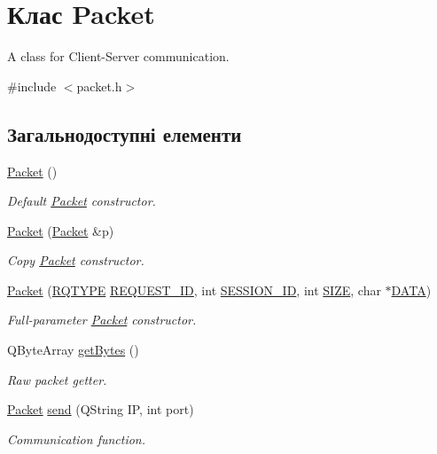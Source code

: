 \hypertarget{classPacket}{\section{Клас Packet}
\label{classPacket}
}


A class for Client-\/\-Server communication.  




{\ttfamily \#include $<$packet.\-h$>$}

\subsection*{Загальнодоступні елементи}
\begin{DoxyCompactItemize}
\item 
\hypertarget{classPacket_aabcfb963c0d5bc0fa554668f92989622}{\hyperlink{classPacket_aabcfb963c0d5bc0fa554668f92989622}{Packet} ()}\label{classPacket_aabcfb963c0d5bc0fa554668f92989622}

\begin{DoxyCompactList}\small\item\em Default \hyperlink{classPacket}{Packet} constructor. \end{DoxyCompactList}\item 
\hypertarget{classPacket_a30fc0d2e5589228708582af6b5b2a576}{\hyperlink{classPacket_a30fc0d2e5589228708582af6b5b2a576}{Packet} (\hyperlink{classPacket}{Packet} \&p)}\label{classPacket_a30fc0d2e5589228708582af6b5b2a576}

\begin{DoxyCompactList}\small\item\em Copy \hyperlink{classPacket}{Packet} constructor. \end{DoxyCompactList}\item 
\hyperlink{classPacket_a3b5e228aeb6b3b4988f69433a9ccfb57}{Packet} (\hyperlink{packet_8h_a15e96d9e79cfa4c3aaba6861be4707e3}{R\-Q\-T\-Y\-P\-E} \hyperlink{classPacket_a1e3e5174c14d3fa58d84e3449fbc8528}{R\-E\-Q\-U\-E\-S\-T\-\_\-\-I\-D}, int \hyperlink{classPacket_ab961c50e0041597c29c52d1e397c5f91}{S\-E\-S\-S\-I\-O\-N\-\_\-\-I\-D}, int \hyperlink{classPacket_a095ff3c0e41af547f0f7cc2464b0cb87}{S\-I\-Z\-E}, char $\ast$\hyperlink{classPacket_abc0a29f961bdd40de882e39601884866}{D\-A\-T\-A})
\begin{DoxyCompactList}\small\item\em Full-\/parameter \hyperlink{classPacket}{Packet} constructor. \end{DoxyCompactList}\item 
Q\-Byte\-Array \hyperlink{classPacket_a0a267f964f5d9bf71159103eda50fbec}{get\-Bytes} ()
\begin{DoxyCompactList}\small\item\em Raw packet getter. \end{DoxyCompactList}\item 
\hyperlink{classPacket}{Packet} \hyperlink{classPacket_aeca5b2428ba736a24fe08c7322b74bb0}{send} (Q\-String I\-P, int port)
\begin{DoxyCompactList}\small\item\em Communication function. \end{DoxyCompactList}\end{DoxyCompactItemize}

